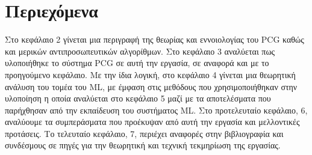 \section{Περιεχόμενα}
Στο κεφάλαιο 2 γίνεται μια περιγραφή της θεωρίας και εννοιολογίας του PCG καθώς και μερικών αντιπροσωπευτικών αλγορίθμων. Στο κεφάλαιο 3 αναλύεται πως υλοποιήθηκε το σύστημα PCG σε αυτή την εργασία, σε αναφορά και με το προηγούμενο κεφάλαιο. Με την ίδια λογική, στο κεφάλαιο 4 γίνεται μια θεωρητική ανάλυση του τομέα του ML, με έμφαση στις μεθόδους που χρησιμοποιήθηκαν στην υλοποίηση η οποία αναλύεται στο κεφάλαιο 5 μαζί με τα αποτελέσματα που παρήχθησαν από την εκπαίδευση του συστήματος ML. Στο προτελευταίο κεφάλαιο, 6, αναλύουμε τα συμπεράσματα που προέκυψαν από αυτή την εργασία και μελλοντικές προτάσεις. Το τελευταίο κεφάλαιο, 7, περιέχει αναφορές στην βιβλιογραφία και συνδέσμους σε πηγές για την θεωρητική και τεχνική τεκμηρίωση της εργασίας.




